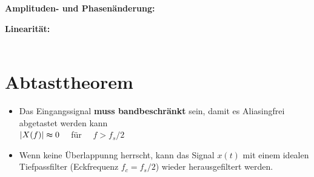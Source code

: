 	\begin{minipage}[t]{0.45\textwidth}
		\textbf{Amplituden- und Phasenänderung:}\\[0.2cm]
	\end{minipage}
	\begin{minipage}[t]{0.55\textwidth}
		\textbf{Linearität:}\\[0.2cm]
		\\[0.2cm]
	\end{minipage}

\section{Abtasttheorem}
	\begin{itemize}
		\item Das Eingangssignal \textbf{muss bandbeschränkt} sein, damit es Aliasingfrei abgetastet werden kann\\
		$|X(f)|\thickapprox 0\quad$ für $\quad f > f_s/2$\\[-0.3cm]
		\item Wenn keine Überlappunng herrscht, kann das Signal $x(t)$ mit einem idealen Tiefpassfilter (Eckfrequenz $f_c = f_s/2$) wieder herausgefiltert werden.\\
	\end{itemize}
	
